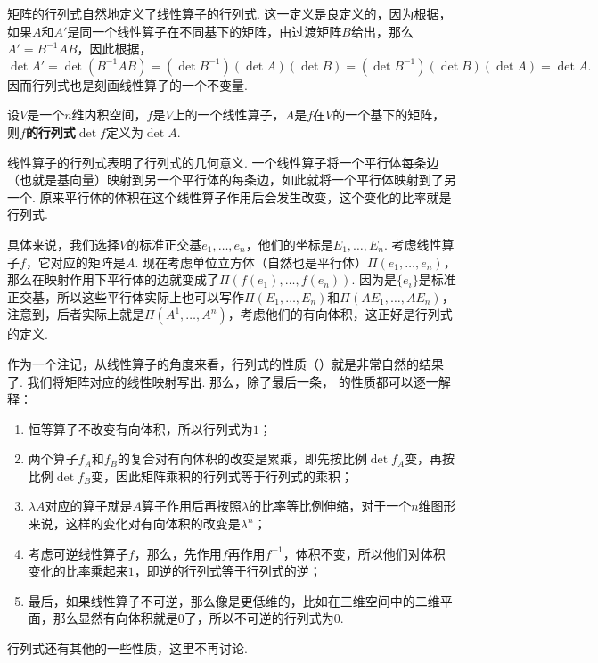 矩阵的行列式自然地定义了线性算子的行列式. 这一定义是良定义的，因为根据，如果$A$和$A'$是同一个线性算子在不同基下的矩阵，由过渡矩阵$B$给出，那么$A'=B^{-1}AB$，因此根据，
\[\det A'=\det(B^{-1}AB)=(\det B^{-1})(\det A)(\det B)=(\det B^{-1})(\det B)(\det A)=\det A.\]
因而行列式也是刻画线性算子的一个不变量. 

\begin{definition}[线性算子的行列式]
设$V$是一个$n$维内积空间，$f$是$V$上的一个线性算子，$A$是$f$在$V$的一个基下的矩阵，则$f$\textbf{的行列式}$\det f$定义为$\det A$.
\end{definition}

线性算子的行列式表明了行列式的几何意义. 一个线性算子将一个平行体每条边（也就是基向量）映射到另一个平行体的每条边，如此就将一个平行体映射到了另一个. 原来平行体的体积在这个线性算子作用后会发生改变，这个变化的比率就是行列式. 

具体来说，我们选择$V$的标准正交基$e_1,\dots,e_n$，他们的坐标是$E_1,\dots,E_n$. 考虑线性算子$f$，它对应的矩阵是$A$. 现在考虑单位立方体（自然也是平行体）$\Pi(e_1,\dots,e_n)$，那么在映射作用下平行体的边就变成了$\Pi(f(e_1),\dots,f(e_n))$. 因为是$\{e_i\}$是标准正交基，所以这些平行体实际上也可以写作$\Pi(E_1,\dots,E_n)$和$\Pi(AE_1,\dots,AE_n)$，注意到，后者实际上就是$\Pi(A^1,\dots, A^n)$，考虑他们的有向体积，这正好是行列式的定义. 

作为一个注记，从线性算子的角度来看，行列式的性质（）就是非常自然的结果了. 我们将矩阵对应的线性映射写出. 那么，除了最后一条， 的性质都可以逐一解释：
\begin{enumerate}
    \item 恒等算子不改变有向体积，所以行列式为$1$；
    \item 两个算子$f_A$和$f_B$的复合对有向体积的改变是累乘，即先按比例$\det f_A$变，再按比例$\det f_B$变，因此矩阵乘积的行列式等于行列式的乘积；
    \item $\lambda A$对应的算子就是$A$算子作用后再按照$\lambda$的比率等比例伸缩，对于一个$n$维图形来说，这样的变化对有向体积的改变是$\lambda^n$；
    \item 考虑可逆线性算子$f$，那么，先作用$f$再作用$f^{-1}$，体积不变，所以他们对体积变化的比率乘起来$1$，即逆的行列式等于行列式的逆；
    \item 最后，如果线性算子不可逆，那么像是更低维的，比如在三维空间中的二维平面，那么显然有向体积就是$0$了，所以不可逆的行列式为$0$.
\end{enumerate}

行列式还有其他的一些性质，这里不再讨论. 

